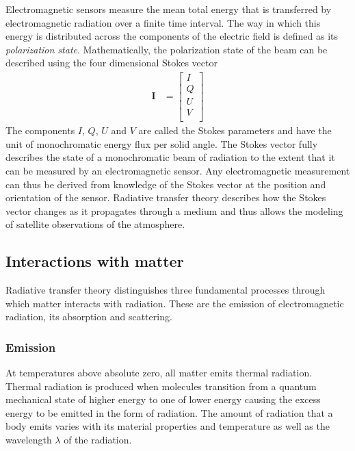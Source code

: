 Electromagnetic sensors measure the mean total energy that is transferred by
electromagnetic radiation over a finite time interval. The way in which this
energy is distributed across the components of the electric field is defined as
its \textit{polarization state}. Mathematically, the polarization state of the
beam can be described using the four dimensional Stokes vector
\begin{align}
  \bm{I} &= \left [ \begin{array}{c}
    I \\
    Q \\
    U \\
    V \\
    \end{array} \right ]
\end{align}
The components $I$, $Q$, $U$ and $V$ are called the Stokes parameters and have the
unit of monochromatic energy flux per solid angle. The Stokes vector fully
describes the state of a monochromatic beam of radiation to the extent that it
can be measured by an electromagnetic sensor. Any electromagnetic
measurement can thus be derived from knowledge of the Stokes vector at the position
and orientation of the sensor. Radiative transfer theory describes how the
Stokes vector changes as it propagates through a medium and thus allows
the modeling of satellite observations of the atmosphere.

\subsection{Interactions with matter}

Radiative transfer theory distinguishes three fundamental processes through
which matter interacts with radiation. These are the emission of
electromagnetic radiation, its absorption and scattering.

\subsubsection{Emission}

At temperatures above absolute zero, all matter emits thermal radiation. Thermal
radiation is produced when molecules transition from a quantum mechanical state
of higher energy to one of lower energy causing the excess energy to be emitted
in the form of radiation. The amount of radiation that a body emits varies with
its material properties and temperature as well as the wavelength $\lambda$ of
the radiation.

